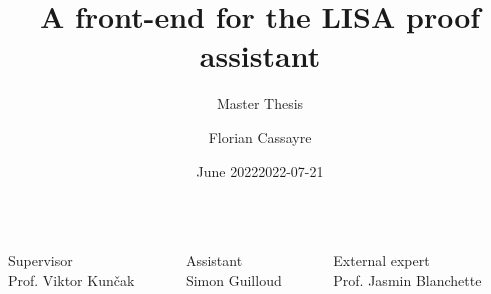 \documentclass{beamer}
\title[Master Thesis]{A front-end for the LISA proof assistant}
\subtitle{Master Thesis}
\author{Florian Cassayre}
\date{June 2022}
\institute[EPFL]{École polytechnique fédérale de Lausanne}
\date{2022-07-21}
\begin{document}
\begin{frame}
\maketitle

\begin{columns}[onlytextwidth]
\begin{column}{0.3333333\textwidth}
\scriptsize Supervisor \\
\small Prof. Viktor Kunčak
\end{column}
\begin{column}{0.3333333\textwidth}
\scriptsize Assistant \\
\small Simon Guilloud
\end{column}
\begin{column}{0.3333333\textwidth}
\scriptsize External expert \\
\small Prof. Jasmin Blanchette
\end{column}
\end{columns}

\end{frame}









\end{document}
